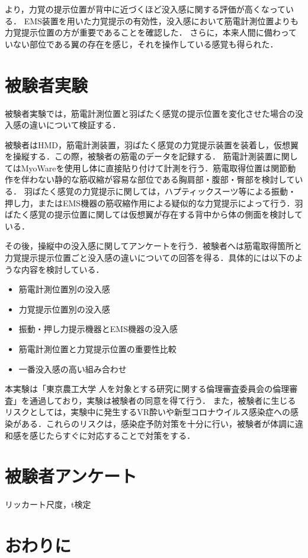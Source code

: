     より，力覚の提示位置が背中に近づくほど没入感に関する評価が高くなっている．
    EMS装置を用いた力覚提示の有効性，没入感において筋電計測位置よりも力覚提示位置の方が重要であることを確認した．
    さらに，本来人間に備わっていない部位である翼の存在を感じ，それを操作している感覚も得られた．

\section{被験者実験}
    
    被験者実験では，筋電計測位置と羽ばたく感覚の提示位置を変化させた場合の没入感の違いについて検証する．
    
    被験者はHMD，筋電計測装置，羽ばたく感覚の力覚提示装置を装着し，仮想翼を操縦する．この際，被験者の筋電のデータを記録する．
    筋電計測装置に関してはMyoWareを使用し体に直接貼り付けて計測を行う．筋電取得位置は関節動作を伴わない静的な筋収縮が容易な部位である胸肩部・腹部・臀部を検討している．
    羽ばたく感覚の力覚提示に関しては，ハプティックスーツ等による振動・押し力，またはEMS機器の筋収縮作用による疑似的な力覚提示によって行う．羽ばたく感覚の提示位置に関しては仮想翼が存在する背中から体の側面を検討している．
    
    その後，操縦中の没入感に関してアンケートを行う．被験者へは筋電取得箇所と力覚提示提示位置ごと没入感の違いについての回答を得る．具体的には以下のような内容を検討している．
    \begin{itemize}
    \item 筋電計測位置別の没入感
    \item 力覚提示位置別の没入感
    \item 振動・押し力提示機器とEMS機器の没入感
    \item 筋電計測位置と力覚提示位置の重要性比較
    \item 一番没入感の高い組み合わせ
    \end{itemize}

    
    本実験は「東京農工大学 人を対象とする研究に関する倫理審査委員会の倫理審査」を通過しており，実験は被験者の同意を得て行う．
    また，被験者に生じるリスクとしては，実験中に発生するVR酔いや新型コロナウイルス感染症への感染がある．これらのリスクは，感染症予防対策を十分に行い，被験者が体調に違和感を感じたらすぐに対応することで対策をする．
    
    
\section{被験者アンケート}
リッカート尺度，t検定


\section{おわりに}